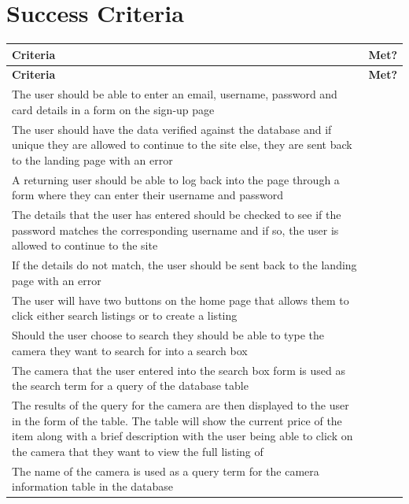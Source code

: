\section{Success Criteria \parencite{oquinn}}
\begin{center}
\begin{longtable}{|p{12.5cm}|p{15mm}|}
  \hline
  \textbf{Criteria} & \textbf{Met?} \\
  \hline
  \endfirsthead
  \hline
  \textbf{Criteria} & \textbf{Met?} \\
  \hline
  \endhead
  \hline 

  \endfoot
  \endlastfoot
  
    The user should be able to enter an email, username, password and card details in a form on the sign-up page & ~ \\ \hline
    The user should have the data verified against the database and if unique they are allowed to continue to the site else, they are sent back to the landing page with an error & ~ \\ \hline
    A returning user should be able to log back into the page through a form where they can enter their username and password & ~ \\ \hline
    The details that the user has entered should be checked to see if the password matches the corresponding username and if so, the user is allowed to continue to the site & ~ \\ \hline
    If the details do not match, the user should be sent back to the landing page with an error & ~ \\ \hline
    The user will have two buttons on the home page that allows them to click either search listings or to create a listing & ~ \\ \hline
    Should the user choose to search they should be able to type the camera they want to search for into a search box & ~ \\ \hline
    The camera that the user entered into the search box form is used as the search term for a query of the database table & ~ \\ \hline
    The results of the query for the camera are then displayed to the user in the form of the table. The table will show the current price of the item along with a brief description with the user being able to click on the camera that they want to view the full listing of & ~ \\ \hline
    The name of the camera is used as a query term for the camera information table in the database & ~ \\ \hline

\end{longtable}
\end{center}
